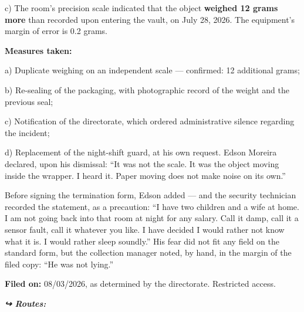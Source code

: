 \noindent c) The room's precision scale indicated that the object \textbf{weighed 12 grams more} than recorded upon entering the vault, on July 28, 2026. The equipment's margin of error is 0.2 grams.

\noindent \textbf{Measures taken:}

\noindent a) Duplicate weighing on an independent scale --- confirmed: 12 additional grams;

\noindent b) Re-sealing of the packaging, with photographic record of the weight and the previous seal;

\noindent c) Notification of the directorate, which ordered administrative silence regarding the incident;

\noindent d) Replacement of the night-shift guard, at his own request. Edson Moreira declared, upon his dismissal: \textquotedblleft{}It was not the scale. It was the object moving inside the wrapper. I heard it. Paper moving does not make noise on its own.\textquotedblright{}

\noindent Before signing the termination form, Edson added --- and the security technician recorded the statement, as a precaution: \textquotedblleft{}I have two children and a wife at home. I am not going back into that room at night for any salary. Call it damp, call it a sensor fault, call it whatever you like. I have decided I would rather not know what it is. I would rather sleep soundly.\textquotedblright{} His fear did not fit any field on the standard form, but the collection manager noted, by hand, in the margin of the filed copy: \textquotedblleft{}He was not lying.\textquotedblright{}

\noindent \textbf{Filed on:} 08/03/2026, as determined by the directorate. Restricted access.

\vspace{0.5em}
\noindent\textit{\textbf{↪ Routes:}  \rotasep {} \rotasep {}}
